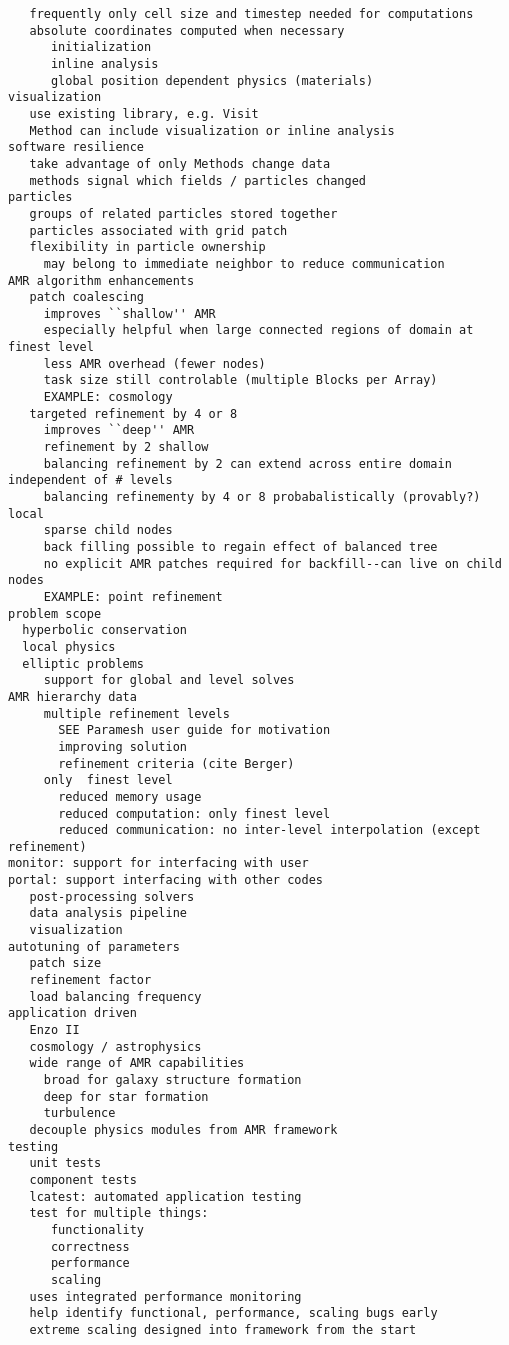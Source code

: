 \documentclass{article}
\begin{document}
\begin{verbatim}
   frequently only cell size and timestep needed for computations
   absolute coordinates computed when necessary
      initialization
      inline analysis
      global position dependent physics (materials)
visualization
   use existing library, e.g. Visit
   Method can include visualization or inline analysis
software resilience
   take advantage of only Methods change data
   methods signal which fields / particles changed
particles
   groups of related particles stored together
   particles associated with grid patch
   flexibility in particle ownership
     may belong to immediate neighbor to reduce communication
AMR algorithm enhancements
   patch coalescing
     improves ``shallow'' AMR
     especially helpful when large connected regions of domain at finest level
     less AMR overhead (fewer nodes)
     task size still controlable (multiple Blocks per Array)
     EXAMPLE: cosmology
   targeted refinement by 4 or 8
     improves ``deep'' AMR
     refinement by 2 shallow
     balancing refinement by 2 can extend across entire domain independent of # levels
     balancing refinementy by 4 or 8 probabalistically (provably?) local
     sparse child nodes
     back filling possible to regain effect of balanced tree
     no explicit AMR patches required for backfill--can live on child nodes 
     EXAMPLE: point refinement
problem scope
  hyperbolic conservation
  local physics
  elliptic problems
     support for global and level solves
AMR hierarchy data
     multiple refinement levels
       SEE Paramesh user guide for motivation
       improving solution
       refinement criteria (cite Berger)
     only  finest level
       reduced memory usage
       reduced computation: only finest level
       reduced communication: no inter-level interpolation (except refinement)
monitor: support for interfacing with user
portal: support interfacing with other codes
   post-processing solvers
   data analysis pipeline
   visualization
autotuning of parameters
   patch size
   refinement factor
   load balancing frequency
application driven
   Enzo II
   cosmology / astrophysics
   wide range of AMR capabilities
     broad for galaxy structure formation
     deep for star formation
     turbulence
   decouple physics modules from AMR framework
testing
   unit tests
   component tests
   lcatest: automated application testing
   test for multiple things:
      functionality
      correctness
      performance
      scaling
   uses integrated performance monitoring
   help identify functional, performance, scaling bugs early
   extreme scaling designed into framework from the start


\end{verbatim}
\end{document}
